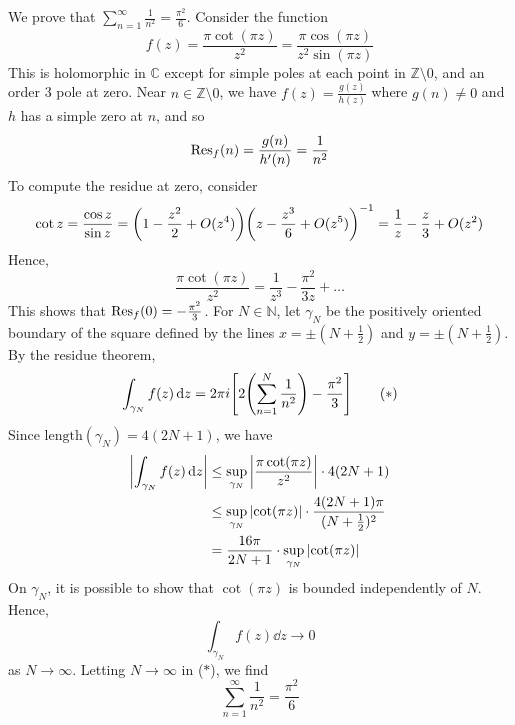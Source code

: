 \begin{example}
	We prove that \( \sum_{n=1}^\infty \frac{1}{n^2} = \frac{\pi^2}{6} \).
	Consider the function
	\[ f(z) = \frac{\pi \cot(\pi z)}{z^2} = \frac{\pi \cos(\pi z)}{z^2 \sin(\pi z)} \]
	This is holomorphic in \( \mathbb C \) except for simple poles at each point in \( \mathbb Z \setminus \qty{0} \), and an order 3 pole at zero.
	Near \( n \in \mathbb Z \setminus \qty{0} \), we have \( f(z) = \frac{g(z)}{h(z)} \) where \( g(n) \neq 0 \) and \( h \) has a simple zero at \( n \), and so
	\[ \Res_f(n) = \frac{g(n)}{h'(n)} = \frac{1}{n^2} \]
	To compute the residue at zero, consider
	\[ \cot z = \frac{\cos z}{\sin z} = \qty(1 - \frac{z^2}{2} + O(z^4)) \qty(z - \frac{z^3}{6} + O(z^5))^{-1} = \frac{1}{z} - \frac{z}{3} + O(z^2) \]
	Hence,
	\[ \frac{\pi \cot(\pi z)}{z^2} = \frac{1}{z^3} - \frac{\pi^2}{3z} + \dots \]
	This shows that \( \Res_f(0) = -\frac{\pi^2}{3} \).
	For \( N \in \mathbb N \), let \( \gamma_N \) be the positively oriented boundary of the square defined by the lines \( x = \pm (N + \frac{1}{2}) \) and \( y = \pm (N + \frac{1}{2}) \).
	By the residue theorem,
	\begin{equation}
		\int_{\gamma_N} f(z) \dd{z} = 2\pi i \qty[2\qty(\sum_{n=1}^N \frac{1}{n^2}) - \frac{\pi^2}{3}] \tag{\(\ast\)}
	\end{equation}
	Since \( \mathrm{length}(\gamma_N) = 4(2N + 1) \), we have
	\begin{align*}
		\abs{\int_{\gamma_N} f(z) \dd{z}} &\leq \sup_{\gamma_N} \abs{\frac{\pi \cot(\pi z)}{z^2}} \cdot 4(2N + 1) \\
		&\leq \sup_{\gamma_N} \abs{\cot(\pi z)} \cdot \frac{4(2N + 1)\pi}{(N+\frac{1}{2})^2} \\
		&= \frac{16 \pi}{2N+1} \cdot \sup_{\gamma_N} \abs{\cot(\pi z)}
	\end{align*}
	On \( \gamma_N \), it is possible to show that \( \cot(\pi z) \) is bounded independently of \( N \).
	Hence,
	\[ \int_{\gamma_N} f(z) \dd{z} \to 0 \]
	as \( N \to \infty \).
	Letting \( N \to \infty \) in (\(\ast\)), we find
	\[ \sum_{n=1}^\infty \frac{1}{n^2} = \frac{\pi^2}{6} \]
\end{example}
